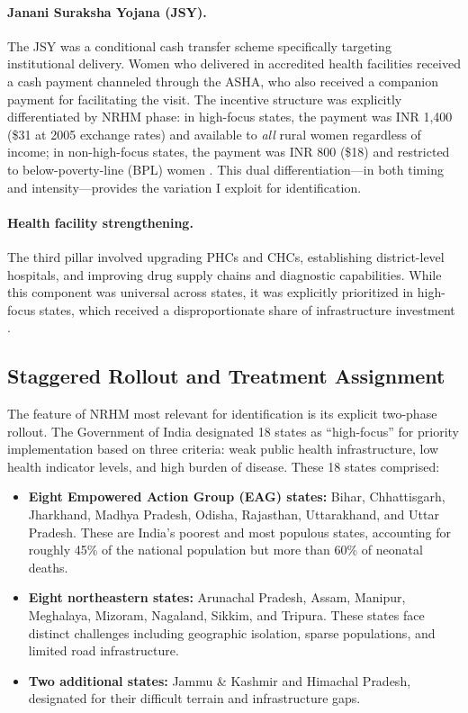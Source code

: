\documentclass[12pt]{article}
\begin{document}
\paragraph{Janani Suraksha Yojana (JSY).} The JSY was a conditional cash transfer scheme specifically targeting institutional delivery. Women who delivered in accredited health facilities received a cash payment channeled through the ASHA, who also received a companion payment for facilitating the visit. The incentive structure was explicitly differentiated by NRHM phase: in high-focus states, the payment was INR 1,400 (\$31 at 2005 exchange rates) and available to \emph{all} rural women regardless of income; in non-high-focus states, the payment was INR 800 (\$18) and restricted to below-poverty-line (BPL) women \citep{lim2010india}. This dual differentiation---in both timing and intensity---provides the variation I exploit for identification.

\paragraph{Health facility strengthening.} The third pillar involved upgrading PHCs and CHCs, establishing district-level hospitals, and improving drug supply chains and diagnostic capabilities. While this component was universal across states, it was explicitly prioritized in high-focus states, which received a disproportionate share of infrastructure investment \citep{NRHM2012}.

\subsection{Staggered Rollout and Treatment Assignment}

The feature of NRHM most relevant for identification is its explicit two-phase rollout. The Government of India designated 18 states as ``high-focus'' for priority implementation based on three criteria: weak public health infrastructure, low health indicator levels, and high burden of disease. These 18 states comprised:

\begin{itemize}
    \item \textbf{Eight Empowered Action Group (EAG) states:} Bihar, Chhattisgarh, Jharkhand, Madhya Pradesh, Odisha, Rajasthan, Uttarakhand, and Uttar Pradesh. These are India's poorest and most populous states, accounting for roughly 45\% of the national population but more than 60\% of neonatal deaths.
    \item \textbf{Eight northeastern states:} Arunachal Pradesh, Assam, Manipur, Meghalaya, Mizoram, Nagaland, Sikkim, and Tripura. These states face distinct challenges including geographic isolation, sparse populations, and limited road infrastructure.
    \item \textbf{Two additional states:} Jammu \& Kashmir and Himachal Pradesh, designated for their difficult terrain and infrastructure gaps.
\end{itemize}
\end{document}
